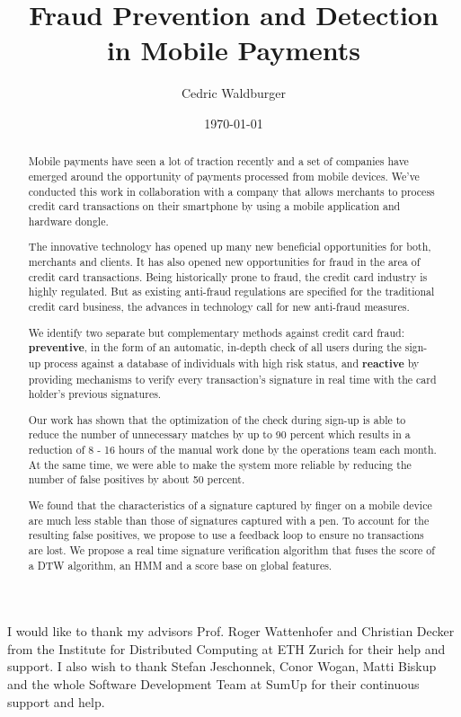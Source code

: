 \documentclass[a4paper, oneside]{csthesis}
\title{Fraud Prevention and Detection\\[5pt] in Mobile Payments}
\author{Cedric Waldburger}
\institute{Distributed Computing Group \\[2pt]
Computer Engineering and Networks Laboratory \\[2pt]
ETH Zurich}
\date{\today}
\begin{document}
\frontmatter
\maketitle %

\cleardoublepage

\begin{acknowledgements}

  I would like to thank my advisors Prof. Roger Wattenhofer and Christian Decker from the Institute for Distributed Computing at ETH Zurich for their help and support. I also wish to thank Stefan Jeschonnek, Conor Wogan, Matti Biskup and the whole Software Development Team at SumUp for their continuous support and help.

\end{acknowledgements}


\begin{abstract}
    Mobile payments have seen a lot of traction recently and a set of companies have emerged around the opportunity of payments processed from mobile devices. We've conducted this work in collaboration with a company that allows merchants to process credit card transactions on their smartphone by using a mobile application and hardware dongle.

    The innovative technology has opened up many new beneficial opportunities for both, merchants and clients. It has also opened new opportunities for fraud in the area of credit card transactions. Being historically prone to fraud, the credit card industry is highly regulated. But as existing anti-fraud regulations are specified for the traditional credit card business, the advances in technology call for new anti-fraud measures.

    We identify two  separate but complementary methods against credit card fraud: \textbf{preventive}, in the form of an automatic, in-depth check of all users during the sign-up process against a database of individuals with high risk status, and \textbf{reactive} by providing mechanisms to verify every transaction's signature in real time with the card holder's previous signatures.

    Our work has shown that the optimization of the check during sign-up is able to reduce the number of unnecessary matches by up to 90 percent which results in a reduction of 8 - 16 hours of the manual work done by the operations team each month. At the same time, we were able to make the system more reliable by reducing the number of false positives by about 50 percent.

    We found that the characteristics of a signature captured by finger on a mobile device are much less stable than those of signatures captured with a pen. To account for the resulting false positives, we propose to use a feedback loop to ensure no transactions are lost. We propose a real time signature verification algorithm that fuses the score of a DTW algorithm, an HMM and a score base on global features.

\end{abstract}
\end{document}
